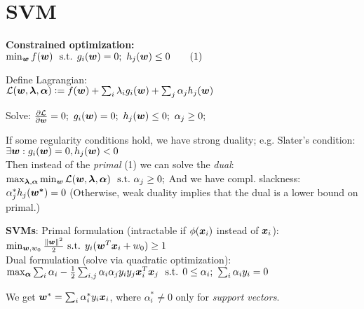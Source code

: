 
\section{SVM}
\textbf{Constrained optimization:}\\
$\min_{\boldsymbol{w}} f(\boldsymbol{w})\ \text{ s.t. } g_i(\boldsymbol{w}) = 0;\ h_j(\boldsymbol{w}) \leq 0 \quad\quad (1)$

Define Lagrangian:\\
$
\mathcal{L}(\boldsymbol{w}, \boldsymbol{\lambda}, \boldsymbol{\alpha})
\vcentcolon=
f(\boldsymbol{w}) + \sum_i \lambda_i g_i(\boldsymbol{w}) + \sum_j \alpha_j h_j(\boldsymbol{w})
$

Solve:
$
\frac{\partial \mathcal{L}}{\partial \b{w}} = 0;\ 
g_i(\b{w}) = 0;\ 
h_j(\b{w}) \leq 0;\ 
\alpha_j \geq 0;\ 
$

If some regularity conditions hold, we have strong duality; e.g. Slater's condition:\\
$
\exists \boldsymbol{w}: g_i(\boldsymbol{w}) = 0, h_j(\boldsymbol{w}) < 0
$\\
Then instead of the \textit{primal} (1) we can solve the \textit{dual}:
$
\max_{\boldsymbol{\lambda}, \boldsymbol{\alpha}} \min_{\boldsymbol{w}} \mathcal{L}(\boldsymbol{w}, \boldsymbol{\lambda}, \boldsymbol{\alpha})
\ \text{ s.t.}\ \alpha_j \geq 0;
$
And we have compl. slackness: $\alpha_j^* h_j(\boldsymbol{w^*}) = 0$
(Otherwise, weak duality implies that the dual is a lower bound on primal.)

\textbf{SVMs}: Primal formulation (intractable if $\phi(\boldsymbol{x}_i)$ instead of $\boldsymbol{x}_i$):\\
$
\min_{\boldsymbol{w}, w_0} \frac{\left\lVert\boldsymbol{w}\right\rVert^2}{2}
 \text{ s.t. }
y_i(\boldsymbol{w}^T \boldsymbol{x}_i + w_0) \geq 1
$\\
Dual formulation (solve via quadratic optimization):
$
\max_{\boldsymbol{\alpha}} \sum_i \alpha_i - \frac{1}{2} \sum_{i,j} \alpha_i \alpha_j y_i y_j \boldsymbol{x}_i^T \boldsymbol{x}_j
\\
\ \text{ s.t. } 0 \leq \alpha_i;\ \sum_i \alpha_i y_i = 0
$

We get $\boldsymbol{w}^* = \sum_i \alpha_i^* y_i \boldsymbol{x}_i$, where $\alpha_i^* \neq 0$ only for \textit{support vectors}.

